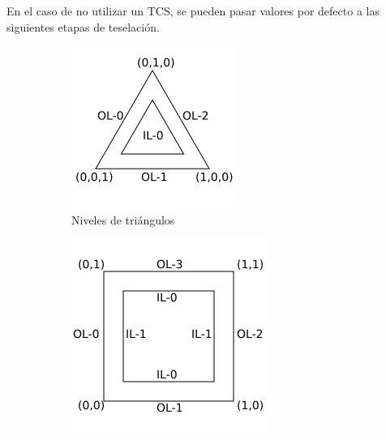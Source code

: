 En el caso de no utilizar un TCS, se pueden pasar valores por defecto a las
siguientes etapas de teselación.

\begin{figure}[t]
	\centering
	\begin{subfigure}{.45\textwidth}
		\includegraphics[width=\textwidth]{figures/TriangleLevels.png}	
		\caption{Niveles de triángulos}
		\label{fig:trilevels}
	\end{subfigure}
	\hfill
	\begin{subfigure}{.45\textwidth}
		\includegraphics[width=\textwidth]{figures/QuadLevels.png}	

\end{subfigure}
\end{figure}
